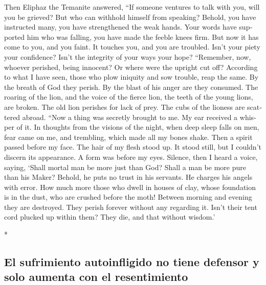 \begin{paracol}{2}
\begin{otherlanguage}{english}
 Then Eliphaz the Temanite answered,  ``If
someone ventures to talk with you, will you be grieved? But who can
withhold himself from speaking?  Behold, you have
instructed many, you have strengthened the weak hands. 
Your words have supported him who was falling, you have made the feeble
knees firm.  But now it has come to you, and you faint. It
touches you, and you are troubled.  Isn't your piety your
confidence? Isn't the integrity of your ways your hope? 
``Remember, now, whoever perished, being innocent? Or where were the
upright cut off?  According to what I have seen, those who
plow iniquity and sow trouble, reap the same.  By the
breath of God they perish. By the blast of his anger are they consumed.
 The roaring of the lion, and the voice of the fierce
lion, the teeth of the young lions, are broken.  The old
lion perishes for lack of prey. The cubs of the lioness are scattered
abroad.  ``Now a thing was secretly brought to me. My ear
received a whisper of it.  In thoughts from the visions
of the night, when deep sleep falls on men,  fear came on
me, and trembling, which made all my bones shake.  Then a
spirit passed before my face. The hair of my flesh stood up.
 It stood still, but I couldn't discern its appearance. A
form was before my eyes. Silence, then I heard a voice, saying,
 `Shall mortal man be more just than God? Shall a man be
more pure than his Maker?  Behold, he puts no trust in
his servants. He charges his angels with error.  How much
more those who dwell in houses of clay, whose foundation is in the dust,
who are crushed before the moth!  Between morning and
evening they are destroyed. They perish forever without any regarding
it.  Isn't their tent cord plucked up within them? They
die, and that without wisdom.'

\end{otherlanguage}

\switchcolumn[0]*

\hypertarget{el-sufrimiento-autoinfligido-no-tiene-defensor-y-solo-aumenta-con-el-resentimiento}{%
\subsection{El sufrimiento autoinfligido no tiene defensor y solo
aumenta con el
resentimiento}\label{el-sufrimiento-autoinfligido-no-tiene-defensor-y-solo-aumenta-con-el-resentimiento}}


\end{paracol}
